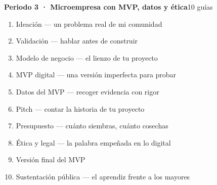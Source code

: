 \noindent\textbf{Periodo 3 · Microempresa con MVP, datos y ética}\hfill{\footnotesize\color{vinoInst}10 guías}\par
\begin{enumerate}[leftmargin=2.6em, itemsep=0.6pt, topsep=2pt, parsep=0pt, label=\footnotesize\arabic*.]
\footnotesize
  \item Ideación --- un problema real de mi comunidad
  \item Validación --- hablar antes de construir
  \item Modelo de negocio --- el lienzo de tu proyecto
  \item MVP digital --- una versión imperfecta para probar
  \item Datos del MVP --- recoger evidencia con rigor
  \item Pitch --- contar la historia de tu proyecto
  \item Presupuesto --- cuánto siembras, cuánto cosechas
  \item Ética y legal --- la palabra empeñada en lo digital
  \item Versión final del MVP
  \item Sustentación pública --- el aprendiz frente a los mayores
\end{enumerate}

